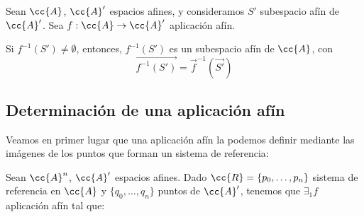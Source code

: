\begin{coro}
    Sean $\cc{A}$, $\cc{A}'$ espacios afines, y consideramos $S'$ subespacio afín de $\cc{A}'$. Sea $f:\cc{A}\to \cc{A}'$ aplicación afín.
    
    Si ${f}^{-1}(S')\neq \emptyset$, entonces, $f^{-1}(S')$ es un subespacio afín de $\cc{A}$, con
    \begin{equation*}
        \vec{f^{-1}(S')} = \vec{f}^{-1}\left(\vec{S'}\right)
    \end{equation*}
\end{coro}

\subsection{Determinación de una aplicación afín}

Veamos en primer lugar que una aplicación afín la podemos definir mediante las imágenes de los puntos que forman un sistema de referencia:
\begin{teo}
    Sean $\cc{A}^n$, $\cc{A}'$ espacios afines. Dado $\cc{R}=\{p_0,\dots,p_n\}$ sistema de referencia en $\cc{A}$ y $\{q_0,\dots,q_n\}$ puntos de $\cc{A}'$, tenemos que $\exists_1 f$ aplicación afín tal que:
\end{teo}
